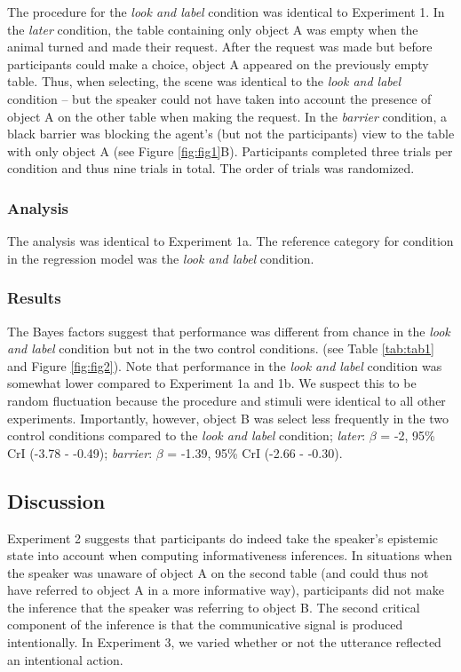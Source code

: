 \documentclass[
  man,floatsintext]{apa6}
\begin{document}
The procedure for the \emph{look and label} condition was identical to Experiment 1. In the \emph{later} condition, the table containing only object A was empty when the animal turned and made their request. After the request was made but before participants could make a choice, object A appeared on the previously empty table. Thus, when selecting, the scene was identical to the \emph{look and label} condition -- but the speaker could not have taken into account the presence of object A on the other table when making the request. In the \emph{barrier} condition, a black barrier was blocking the agent's (but not the participants) view to the table with only object A (see Figure \ref{fig:fig1}B). Participants completed three trials per condition and thus nine trials in total. The order of trials was randomized.

\hypertarget{analysis-2}{%
\subsubsection{Analysis}\label{analysis-2}}

The analysis was identical to Experiment 1a. The reference category for condition in the regression model was the \emph{look and label} condition.

\hypertarget{results-2}{%
\subsubsection{Results}\label{results-2}}

The Bayes factors suggest that performance was different from chance in the \emph{look and label} condition but not in the two control conditions. (see Table \ref{tab:tab1} and Figure \ref{fig:fig2}). Note that performance in the \emph{look and label} condition was somewhat lower compared to Experiment 1a and 1b. We suspect this to be random fluctuation because the procedure and stimuli were identical to all other experiments. Importantly, however, object B was select less frequently in the two control conditions compared to the \emph{look and label} condition; \emph{later}: \(\beta\) = -2, 95\% CrI (-3.78 - -0.49); \emph{barrier}: \(\beta\) = -1.39, 95\% CrI (-2.66 - -0.30).

\hypertarget{discussion-2}{%
\subsection{Discussion}\label{discussion-2}}

Experiment 2 suggests that participants do indeed take the speaker's epistemic state into account when computing informativeness inferences. In situations when the speaker was unaware of object A on the second table (and could thus not have referred to object A in a more informative way), participants did not make the inference that the speaker was referring to object B. The second critical component of the inference is that the communicative signal is produced intentionally. In Experiment 3, we varied whether or not the utterance reflected an intentional action.
\end{document}
